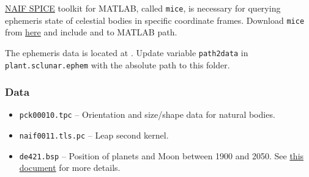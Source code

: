 \documentclass[12pt,letterpaper]{article}
\begin{document}
\href{https://naif.jpl.nasa.gov/naif/toolkit.html}{NAIF SPICE} toolkit for MATLAB, called \texttt{mice}, is necessary for querying ephemeris state of celestial bodies in specific coordinate frames. Download \texttt{mice} from \href{https://naif.jpl.nasa.gov/naif/toolkit_MATLAB.html}{here} and include  and  to MATLAB path.


The ephemeris data is located at . Update variable \texttt{path2data} in \texttt{plant.sclunar.ephem} with the absolute path to this folder.
\subsubsection*{Data}

\begin{itemize}
    \item \texttt{pck00010.tpc} -- Orientation and size/shape data for natural bodies.
    \item \texttt{naif0011.tls.pc} -- Leap second kernel.
    \item  \texttt{de421.bsp} -- Position of planets and Moon between 1900 and 2050. See \href{https://ipnpr.jpl.nasa.gov/progress_report/42-178/178C.pdf}{this document} for more details.
\end{itemize}
\end{document}
